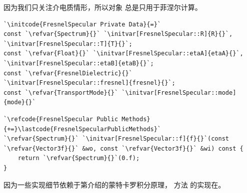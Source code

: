 因为我们只关注介电质情形，所以对象
总是只用于菲涅尔计算。

\begin{lstlisting}
`\initcode{FresnelSpecular Private Data}{=}`
const `\refvar{Spectrum}{}` `\initvar[FresnelSpecular::R]{R}{}`, `\initvar[FresnelSpecular::T]{T}{}`;
const `\refvar{Float}{}` `\initvar[FresnelSpecular::etaA]{etaA}{}`, `\initvar[FresnelSpecular::etaB]{etaB}{}`;
const `\refvar{FresnelDielectric}{}` `\initvar[FresnelSpecular::fresnel]{fresnel}{}`;
const `\refvar{TransportMode}{}` `\initvar[FresnelSpecular::mode]{mode}{}`
\end{lstlisting}
\begin{lstlisting}
`\refcode{FresnelSpecular Public Methods}{+=}\lastcode{FresnelSpecularPublicMethods}`
`\refvar{Spectrum}{}` `\initvar[FresnelSpecular::f]{f}{}`(const `\refvar{Vector3f}{}` &wo, const `\refvar{Vector3f}{}` &wi) const { 
    return `\refvar{Spectrum}{}`(0.f); 
}
\end{lstlisting}

因为一些实现细节依赖于第介绍的蒙特卡罗积分原理，
方法
的实现在。